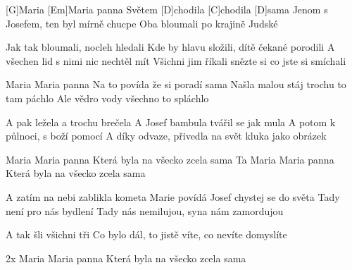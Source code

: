 
[G]Maria [Em]Maria panna
Světem [D]chodila [C]chodila [D]sama
Jenom s Josefem, ten byl mírně chucpe
Oba bloumali po krajině Judské

Jak tak bloumali, nocleh hledali
Kde by hlavu složili, dítě čekané porodili
A všechen lid s nimi nic nechtěl mít
Všichni jim říkali snězte si co jste si smíchali

Maria Maria panna
Na to povída že si poradí sama
Našla malou stáj trochu to tam páchlo
Ale vědro vody všechno to spláchlo

A pak ležela a trochu brečela
A Josef bambula tvářil se jak mula
A potom k půlnoci, s boží pomocí
A díky odvaze, přivedla na svět kluka jako obrázek

Maria Maria panna
Která byla na všecko zcela sama
Ta Maria Maria panna
Která byla na všecko zcela sama

A zatím na nebi zablikla kometa
Marie povídá Josef chystej se do světa
Tady není pro nás bydlení
Tady nás nemilujou, syna nám zamordujou

A tak šli všichni tři
Co bylo dál, to jistě víte, co nevíte domyslíte

2x Maria Maria panna
Která byla na všecko zcela sama
